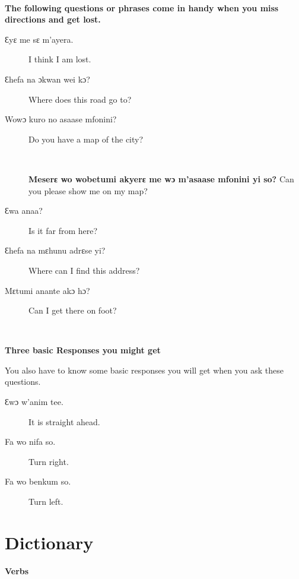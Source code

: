\documentclass[%
 fontsize=11pt,%
 a5paper,pagesize,
 paper=a5,%
 DIV=9,%
 parskip=half*,%
 twoside=true,
 pointlessnumbers
]{scrbook}%
\begin{document}
~



\textbf{The following questions or phrases come in handy when you miss directions and get lost.}

\begin{description}
  \item[Ɛyε me sε m’ayera.]  I think I am lost.
  \item[Ɛhefa na ɔkwan wei kɔ?] Where does this road go to?
  \item[Wowɔ kuro no asaase mfonini?] Do you have a map of the city?
  \item[~] \textbf{Meserε wo wobetumi akyerε me wɔ m’asaase mfonini yi so?} Can you please show me on my map?
  \item[Ɛwa anaa?] Is it far from here?
  \item[Ɛhefa na mεhunu adrεse yi?] Where can I find this address?
  \item[Mεtumi anante akɔ hɔ?] Can I get there on foot?
\end{description}

~


\textbf{Three basic Responses you might get}

You also have to know some basic responses you will get when you ask these questions.

\begin{description}
  \item[Ɛwɔ w’anim tee.]  It is straight ahead.
  \item[Fa wo nifa so.] Turn right.
  \item[Fa wo benkum so.] Turn left.
\end{description}

\chapter{Dictionary}

{\large \textbf{Verbs}}
\end{document}
